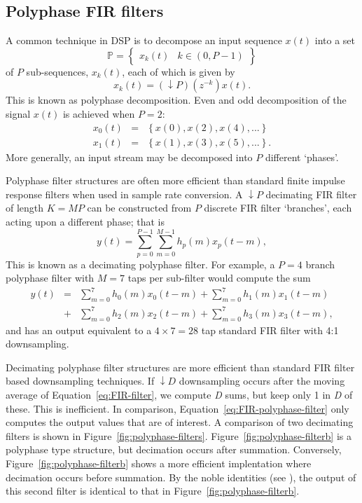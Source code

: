 \documentclass{ws-rv961x669}
\begin{document}
\subsection{Polyphase FIR filters}

A common technique in DSP is to decompose an input sequence $x(t)$
into a set
\begin{equation}
\mathbb{P}=\begin{Bmatrix}x_{k}(t) & k\in(0,P-1)\end{Bmatrix}
\end{equation}
of $P$ sub-sequences, $x_{k}(t)$, each of which is given by 
\begin{equation}
x_{k}(t)=(\downarrow P)(z^{-k})x(t).
\end{equation}
This is known as polyphase decomposition. Even and odd decomposition
of the signal $x(t)$ is achieved when $P=\mbox{2}$:
\begin{eqnarray}
x_{0}(t) & = & \left\{ x(0),x(2),x(4),...\right\} \\
x_{1}(t) & = & \left\{ x(1),x(3),x(5),...\right\} .
\end{eqnarray}
More generally, an input stream may be decomposed into $P$ different
`phases'.

Polyphase filter structures are often more efficient than standard
finite impulse response filters when used in sample rate conversion.
A $\downarrow P$ decimating FIR filter of length $K=MP$ can be constructed
from $P$ discrete FIR filter `branches', each acting upon a different
phase; that is
\begin{equation}
y(t)=\sum_{p=0}^{P-1}\sum_{m=0}^{M-1}h_{p}(m)x_{p}(t-m),\label{eq:FIR-polyphase-filter}
\end{equation}
This is known as a decimating polyphase filter. For example, a $P=\mbox{4}$
branch polyphase filter with $M=\mbox{7}$ taps per sub-filter would
compute the sum
\begin{eqnarray}
y(t) & = & \sum_{m=0}^{7}h_{0}(m)x_{0}(t-m)+\sum_{m=0}^{7}h_{1}(m)x_{1}(t-m)\nonumber \\
 & + & \sum_{m=0}^{7}h_{2}(m)x_{2}(t-m)+\sum_{m=0}^{7}h_{3}(m)x_{3}(t-m),
\end{eqnarray}
and has an output equivalent to a $\mbox{4}\times\mbox{7}=\mbox{28}$
tap standard FIR filter with 4:1 downsampling. 

Decimating polyphase filter structures are more efficient than standard
FIR filter based downsampling techniques. If $\downarrow D$ downsampling
occurs after the moving average of Equation~\ref{eq:FIR-filter},
we compute \emph{D} sums, but keep only 1 in \emph{D} of these. This
is inefficient. In comparison, Equation~\ref{eq:FIR-polyphase-filter}
only computes the output values that are of interest. A comparison
of two decimating filters is shown in Figure~\ref{fig:polyphase-filters}.
Figure~\ref{fig:polyphase-filterb} is a polyphase type structure,
but decimation occurs after summation. Conversely, Figure~\ref{fig:polyphase-filterb}
shows a more efficient implentation where decimation occurs before
summation. By the noble identities (see \citep{Vaidyanathan:1990p6127}),
the output of this second filter is identical to that in Figure~\ref{fig:polyphase-filterb}.
\end{document}
